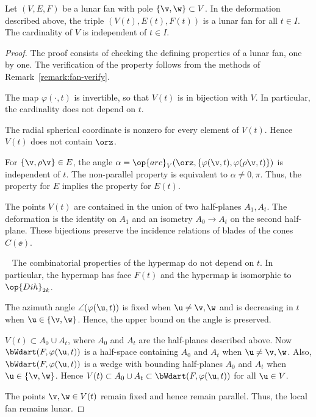 \begin{lemma}[]\label{lemma:lunar-deform} 
Let $(V,E,F)$ be a lunar fan with pole $\{\v,\w\}\subset V$.  In
the deformation described above, the triple $(V(t),E(t),F(t))$ is a
lunar  fan for all $t\in I$.  The cardinality of $V$ is
independent of $t\in I$.
\end{lemma}

\begin{proof} The proof consists of checking the defining properties of a lunar fan, 
one by one.  The verification of the property 
follows from the methods of Remark~\ref{remark:fan-verify}.

The map $\varphi(\cdot,t)$ is invertible, so that $V(t)$ is in
bijection with $V$.  In particular, the cardinality does not depend
on $t$.

 The radial spherical coordinate is nonzero for every
element of $V(t)$.  Hence $V(t)$ does not contain $\orz$.

 For $\{\v,\rho \v\}\in E$, the angle
$\alpha=\op{arc}_V(\orz,\{\varphi(\v,t),\varphi(\rho \v,t)\})$ is
independent of $t$.  The non-parallel property is equivalent to
$\alpha\ne0,\pi$.  Thus, the  property for $E$ implies
the property for $E(t)$.

 The points $V(t)$ are contained in the union of
two half-planes $A_1,A_t$.  The deformation is the identity on $A_1$
and an isometry $A_0\to A_t$ on the second half-plane.  These
bijections preserve the incidence relations of blades of the cones
$C(\ee)$.

~ The combinatorial properties of
the hypermap do not depend on $t$.  In particular, the hypermap has
face $F(t)$ and the hypermap is isomorphic to $\op{Dih}_{2k}$.

 The azimuth angle $\angle(\varphi(\u,t))$ is fixed when
$\u\ne \v,\w$ and is decreasing in $t$ when $\u\in \{\v,\w\}$.
Hence, the upper bound on the angle is preserved.

 $V(t)\subset A_0\cup A_t$, where $A_0$ and $A_t$ are
the half-planes described above.  Now $\bWdart(F,\varphi(\u,t))$ is
a half-space containing $A_0$ and $A_t$ when $\u\ne \v,\w$.  Also,
$\bWdart(F,\varphi(\u,t))$ is a wedge with bounding half-planes
$A_0$ and $A_t$ when $\u\in \{\v,\w\}$.  Hence $V(t)\subset A_0\cup
A_t\subset \bWdart(F,\varphi(\u,t))$ for all $\u\in V$.

 The points $\v,\w\in V(t)$ remain fixed and hence
remain parallel.  Thus, the local fan remains lunar.
\end{proof}
%

